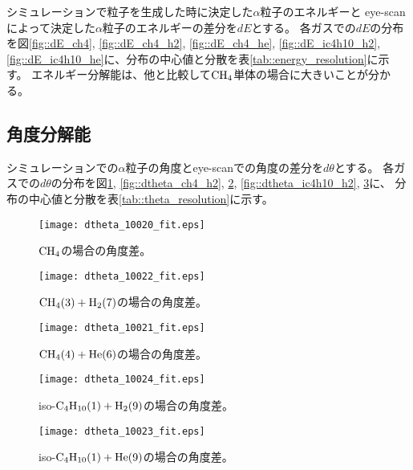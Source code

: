 \documentclass[../master]{subfiles}
\begin{document}
シミュレーションで粒子を生成した時に決定した$\alpha$粒子のエネルギーと
eye-scanによって決定した$\alpha$粒子のエネルギーの差分を$dE$とする。
各ガスでの$dE$の分布を図\ref{fig::dE_ch4}, \ref{fig::dE_ch4_h2}, \ref{fig::dE_ch4_he},
\ref{fig::dE_ic4h10_h2}, \ref{fig::dE_ic4h10_he}に、分布の中心値と分散を表\ref{tab::energy_resolution}に示す。
エネルギー分解能は、他と比較して$\rm CH_{4}$単体の場合に大きいことが分かる。

\subsection{角度分解能}
シミュレーションでの$\alpha$粒子の角度とeye-scanでの角度の差分を$d\theta$とする。
各ガスでの$d\theta$の分布を図\ref{fig::dtheta_ch4}, \ref{fig::dtheta_ch4_h2}, \ref{fig::dtheta_ch4_he},
\ref{fig::dtheta_ic4h10_h2}, \ref{fig::dtheta_ic4h10_he}に、
分布の中心値と分散を表\ref{tab::theta_resolution}に示す。
\begin{figure}
  \centering
  \begin{minipage}{0.45\columnwidth}
    \centering
    \texttt{[image: dtheta\_10020\_fit.eps]}
    \caption{$\rm CH_{4}$の場合の角度差。}
    \label{fig::dtheta_ch4}
  \end{minipage}  
\end{figure}
\begin{figure}
  \centering
  \begin{minipage}{0.45\columnwidth}
    \centering
    \texttt{[image: dtheta\_10022\_fit.eps]}
    \caption{$\rm CH_{4} (3) + H_{2} (7)$の場合の角度差。}
    \label{fig::dtheta_ch4_h2}
  \end{minipage}
  \begin{minipage}{0.45\columnwidth}
    \centering
    \texttt{[image: dtheta\_10021\_fit.eps]}
    \caption{$\rm CH_{4} (4) + He (6)$の場合の角度差。}
    \label{fig::dtheta_ch4_he}
  \end{minipage}
\end{figure}
\begin{figure}
  \centering
  \begin{minipage}{0.45\columnwidth}
    \centering
    \texttt{[image: dtheta\_10024\_fit.eps]}
    \caption{iso-$\rm C_{4}H_{10} (1) + H_{2} (9)$の場合の角度差。}
    \label{fig::dtheta_ic4h10_h2}
  \end{minipage}
  \begin{minipage}{0.45\columnwidth}
    \centering
    \texttt{[image: dtheta\_10023\_fit.eps]}
    \caption{iso-$\rm C_{4}H_{10} (1) + He (9)$の場合の角度差。}
    \label{fig::dtheta_ic4h10_he}
  \end{minipage}
\end{figure}
\end{document}
